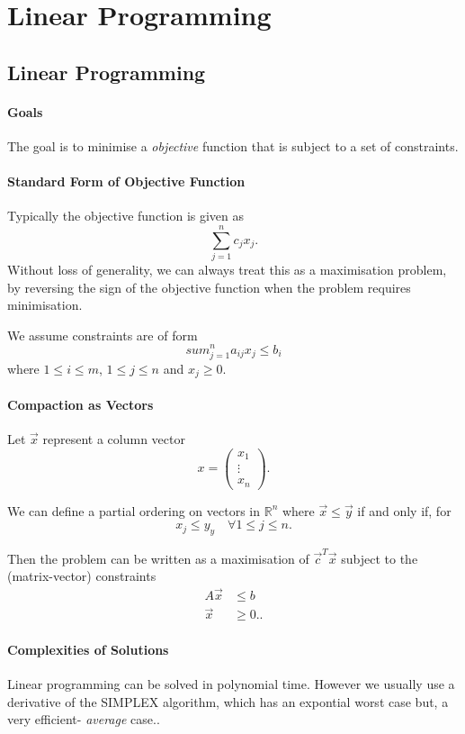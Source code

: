 \section{Linear Programming}


\subsection{Linear Programming}

\paragraph{Goals}
The goal is to minimise a \textit{objective} function that is subject to a set of constraints.

\paragraph{Standard Form of Objective Function}
Typically the objective function is given as \[
  \sum_{j = 1}^{n} c_j x_j
.\] 
Without loss of generality, we can always treat this as a maximisation problem,
by reversing the sign of the objective function when the problem requires minimisation.

We assume constraints are of form \[
  sum_{j = 1}^n a_{ij} x_{j} \leq b_i
\]  where \(1 \leq i \leq m\), \(1 \leq j \leq n\) and \(x_j \geq 0\).

\paragraph{Compaction as Vectors}
Let \(\vec{x}\) represent a column vector \[
  x = \begin{pmatrix} x_1 \\ \vdots \\ x_n \end{pmatrix} 
.\] 

We can define a partial ordering on vectors in \(\mathbb{R}^n\) where \(\vec{x} \leq \vec{y}\) if and only if,
for \[
  x_j \leq y_y \quad \forall 1 \leq j \leq n
.\] 

Then the problem can be written as a maximisation of \(\vec{c}^T \vec{x}\) subject to the
(matrix-vector) constraints
\begin{align*}
  A\vec{x} &\leq b\\
  \vec{x} &\geq 0.
.\end{align*}

\paragraph{Complexities of Solutions}
Linear programming can be solved in polynomial time. However we usually use a derivative of the
SIMPLEX algorithm, which has an expontial worst case but, a very efficient-
\textit{average} case..

